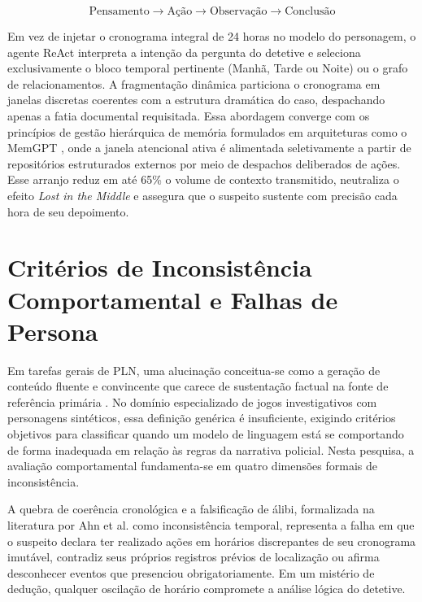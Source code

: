 \begin{equation}
\text{Pensamento} \rightarrow \text{Ação} \rightarrow \text{Observação} \rightarrow \text{Conclusão}
\label{eq:ciclo_react}
\end{equation}

Em vez de injetar o cronograma integral de 24 horas no modelo do personagem, o agente ReAct interpreta a intenção da pergunta do detetive e seleciona exclusivamente o bloco temporal pertinente (Manhã, Tarde ou Noite) ou o grafo de relacionamentos. A fragmentação dinâmica particiona o cronograma em janelas discretas coerentes com a estrutura dramática do caso, despachando apenas a fatia documental requisitada. Essa abordagem converge com os princípios de gestão hierárquica de memória formulados em arquiteturas como o MemGPT \cite{packer2023memgpt}, onde a janela atencional ativa é alimentada seletivamente a partir de repositórios estruturados externos por meio de despachos deliberados de ações. Esse arranjo reduz em até 65\% o volume de contexto transmitido, neutraliza o efeito \textit{Lost in the Middle} e assegura que o suspeito sustente com precisão cada hora de seu depoimento.

\section{Critérios de Inconsistência Comportamental e Falhas de Persona}
\label{sec:ref_alucinacoes}

Em tarefas gerais de PLN, uma alucinação conceitua-se como a geração de conteúdo fluente e convincente que carece de sustentação factual na fonte de referência primária \cite{ji2023survey}. No domínio especializado de jogos investigativos com personagens sintéticos, essa definição genérica é insuficiente, exigindo critérios objetivos para classificar quando um modelo de linguagem está se comportando de forma inadequada em relação às regras da narrativa policial. Nesta pesquisa, a avaliação comportamental fundamenta-se em quatro dimensões formais de inconsistência.

A quebra de coerência cronológica e a falsificação de álibi, formalizada na literatura por Ahn et al. \cite{ahn2024timechara} como inconsistência temporal, representa a falha em que o suspeito declara ter realizado ações em horários discrepantes de seu cronograma imutável, contradiz seus próprios registros prévios de localização ou afirma desconhecer eventos que presenciou obrigatoriamente. Em um mistério de dedução, qualquer oscilação de horário compromete a análise lógica do detetive.

